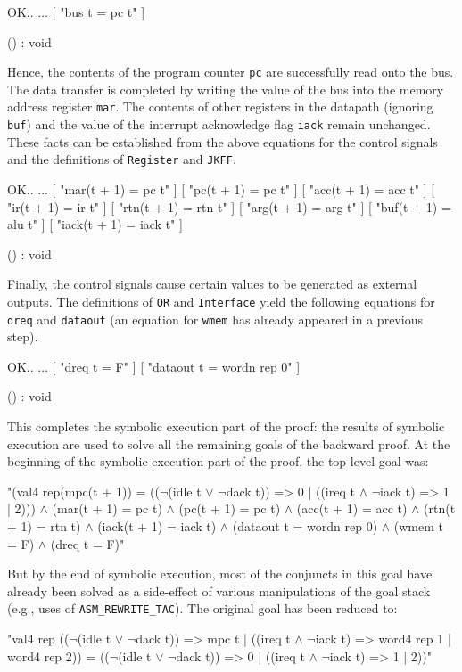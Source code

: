 \begintt
OK..
   \(\ldots\)
    [ "bus t = pc t" ]

() : void
\endtt

Hence, the contents of the program counter \verb"pc" are
successfully read onto the bus.
The data transfer is completed by writing the value of the bus into
the memory address register \verb"mar".
The contents of other registers in the datapath (ignoring \verb"buf")
and the value of the interrupt acknowledge flag \verb"iack"
remain unchanged.
These facts can be established
from the above equations for the control signals and the
definitions of \verb"Register" and \verb"JKFF".

\begintt
OK..
   \(\ldots\)
    [ "mar(t + 1) = pc t" ]
    [ "pc(t + 1) = pc t" ]
    [ "acc(t + 1) = acc t" ]
    [ "ir(t + 1) = ir t" ]
    [ "rtn(t + 1) = rtn t" ]
    [ "arg(t + 1) = arg t" ]
    [ "buf(t + 1) = alu t" ]
    [ "iack(t + 1) = iack t" ]

() : void
\endtt

Finally, the control signals cause certain values to be generated
as external outputs.  The definitions of \verb"OR" and \verb"Interface"
yield the following equations for \verb"dreq" and \verb"dataout"
(an equation for \verb"wmem" has already appeared in a previous step).

\begintt
OK..
   \(\ldots\)
    [ "dreq t = F" ]
    [ "dataout t = wordn rep 0" ]

() : void
\endtt

This completes the symbolic execution part of the proof:
the results of symbolic execution are used to solve
all the remaining goals of the backward proof.
At the beginning of the symbolic execution part of the proof,
the top level goal was:

\begintt
"(val4 rep(mpc(t + 1)) =
  ((\(\neg\)(idle t \(\vee\) \(\neg\)dack t)) => 0 | ((ireq t \(\wedge\) \(\neg\)iack t) => 1 | 2))) \(\wedge\)
 (mar(t + 1) = pc t) \(\wedge\)
 (pc(t + 1) = pc t) \(\wedge\)
 (acc(t + 1) = acc t) \(\wedge\)
 (rtn(t + 1) = rtn t) \(\wedge\)
 (iack(t + 1) = iack t) \(\wedge\)
 (dataout t = wordn rep 0) \(\wedge\)
 (wmem t = F) \(\wedge\)
 (dreq t = F)"
\endtt

But by the end of symbolic execution,
most of the conjuncts in this goal have already been solved
as a side-effect of various manipulations of the goal stack
(e.g., uses of \verb"ASM_REWRITE_TAC").
The original goal has been reduced to:

\begintt
"val4 
 rep
 ((\(\neg\)(idle t \(\vee\) \(\neg\)dack t)) => 
  mpc t | 
  ((ireq t \(\wedge\) \(\neg\)iack t) => word4 rep 1 | word4 rep 2)) =
 ((\(\neg\)(idle t \(\vee\) \(\neg\)dack t)) => 0 | ((ireq t \(\wedge\) \(\neg\)iack t) => 1 | 2))"
\endtt



